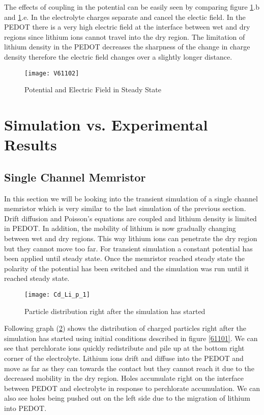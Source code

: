 The effects of coupling in the potential can be easily seen by comparing figure \ref{V61102}.b and \ref{V61102}.e. In the electrolyte charges separate and cancel the electic field. In the PEDOT there is a very high electric field at the interface between wet and dry regions since lithium ions cannot travel into the dry region. The limitation of lithium density in the PEDOT decreases the sharpness of the change in charge density therefore the electric field changes over a slightly longer distance. 
\begin{landscape}
\begin{figure}[!htp]
\centering
\texttt{[image: V61102]}
\caption{Potential and Electric Field in Steady State} 
\label{V61102}
\end{figure}
\end{landscape}


\clearpage
\section{Simulation vs. Experimental Results}

\subsection{Single Channel Memristor}

In this section we will be looking into the transient simulation of a single channel memristor which is very similar to the last simulation of the previous section. Drift diffusion and Poisson's equations are coupled and lithium density is limited in PEDOT. In addition, the mobility of lithium is now gradually changing between wet and dry regions. This way lithium ions can penetrate the dry region but they cannot move too far. For transient simulation a constant potential has been applied until steady state. Once the memristor reached steady state the polarity of the potential has been switched and the simulation was run until it reached steady state. 

\begin{figure}[!htp]
\centering
\texttt{[image: Cd\_Li\_p\_1]}
\caption{Particle distribution right after the simulation has started} 
\label{Cd_Li_p_1}
\end{figure}

Following graph (\ref{Cd_Li_p_1}) shows the distribution of charged particles right after the simulation has started using initial conditions described in figure \ref{61101}. We can see that perchlorate ions quickly redistribute and pile up at the bottom right corner of the electrolyte. Lithium ions drift and diffuse into the PEDOT and move as far as they can towards the contact but they cannot reach it due to the decreased mobility in the dry region. Holes accumulate right on the interface between PEDOT and electrolyte in response to perchlorate accumulation. We can also see holes being pushed out on the left side due to the migration of lithium into PEDOT. 

